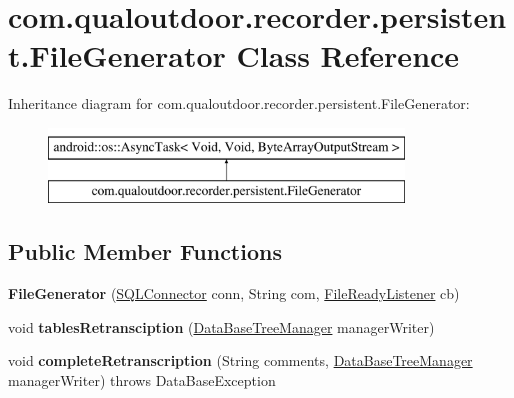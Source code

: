 \hypertarget{classcom_1_1qualoutdoor_1_1recorder_1_1persistent_1_1FileGenerator}{\section{com.\-qualoutdoor.\-recorder.\-persistent.\-File\-Generator Class Reference}
\label{classcom_1_1qualoutdoor_1_1recorder_1_1persistent_1_1FileGenerator}
}
Inheritance diagram for com.\-qualoutdoor.\-recorder.\-persistent.\-File\-Generator\-:\begin{figure}[H]
\begin{center}
\leavevmode
\includegraphics[height=2.000000cm]{classcom_1_1qualoutdoor_1_1recorder_1_1persistent_1_1FileGenerator}
\end{center}
\end{figure}
\subsection*{Public Member Functions}
\begin{DoxyCompactItemize}
\item 
\hypertarget{classcom_1_1qualoutdoor_1_1recorder_1_1persistent_1_1FileGenerator_a766a2563189b08c09e71d6f7d9539f59}{{\bfseries File\-Generator} (\hyperlink{classcom_1_1qualoutdoor_1_1recorder_1_1persistent_1_1SQLConnector}{S\-Q\-L\-Connector} conn, String com, \hyperlink{interfacecom_1_1qualoutdoor_1_1recorder_1_1persistent_1_1FileReadyListener}{File\-Ready\-Listener} cb)}\label{classcom_1_1qualoutdoor_1_1recorder_1_1persistent_1_1FileGenerator_a766a2563189b08c09e71d6f7d9539f59}

\item 
\hypertarget{classcom_1_1qualoutdoor_1_1recorder_1_1persistent_1_1FileGenerator_abf5a34fd333f9f20f40f57e10b8a61a1}{void {\bfseries tables\-Retransciption} (\hyperlink{classcom_1_1qualoutdoor_1_1recorder_1_1persistent_1_1DataBaseTreeManager}{Data\-Base\-Tree\-Manager} manager\-Writer)}\label{classcom_1_1qualoutdoor_1_1recorder_1_1persistent_1_1FileGenerator_abf5a34fd333f9f20f40f57e10b8a61a1}

\item 
\hypertarget{classcom_1_1qualoutdoor_1_1recorder_1_1persistent_1_1FileGenerator_afec92c44c04a4ecb7d1c490dafd8043b}{void {\bfseries complete\-Retranscription} (String comments, \hyperlink{classcom_1_1qualoutdoor_1_1recorder_1_1persistent_1_1DataBaseTreeManager}{Data\-Base\-Tree\-Manager} manager\-Writer)  throws Data\-Base\-Exception }\label{classcom_1_1qualoutdoor_1_1recorder_1_1persistent_1_1FileGenerator_afec92c44c04a4ecb7d1c490dafd8043b}

\end{DoxyCompactItemize}
